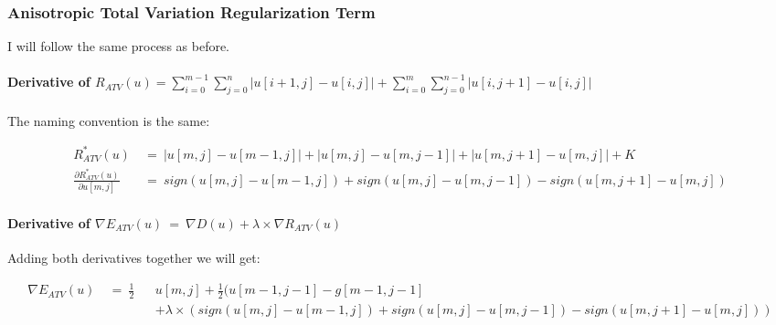 \documentclass{report}
\begin{document}
			\subsubsection{Anisotropic Total Variation Regularization Term}
			\startsubsection
				I will follow the same process as before.
				\vspace{-0.4cm} \paragraph{Derivative of $R_{ATV}(u) = \sum_{i=0}^{m-1} \sum_{j=0}^{n} | u[i+1,j] - u[i,j] | + \sum_{i=0}^{m} \sum_{j=0}^{n-1} | u[i,j+1] - u[i,j] |$}
				\startsubsection
					\vspace{0.2cm} The naming convention is the same:
				\closesection
				\begin{adjustwidth}{-4em}{}
					\vspace{-0.5cm}
					\begin{align*}
						R_{ATV}^*(u) \ & = \ |u[m,j] - u[m-1,j]| + |u[m,j] - u[m,j-1]| + |u[m,j+1] - u[m,j]| + K \\
						\frac{\partial R_{ATV}^*(u)}{\partial u[m,j]} \ & = \ sign(u[m,j] - u[m-1,j]) + sign(u[m,j] - u[m,j-1]) - sign(u[m,j+1] - u[m,j])
					\end{align*}
				\end{adjustwidth}
				\vspace{-0.4cm} \paragraph{Derivative of $\nabla E_{ATV}(u) \ = \ \nabla D(u) + \lambda \times \nabla R_{ATV}(u)$}
				\startsubsection
					Adding both derivatives together we will get:
				\closesection
				\begin{adjustwidth}{-6em}{}
					\vspace{-0.6cm}
					\begin{align*}
						\nabla E_{ATV}(u) \ & = \ \frac{1}{2} && u[m,j]  + \frac{1}{2} (u[m-1,j-1] - g[m-1,j-1] \\
						&&& + \lambda \times (sign(u[m,j] - u[m-1,j]) + sign(u[m,j] - u[m,j-1]) - sign(u[m,j+1] - u[m,j]))
					\end{align*}
				\end{adjustwidth}
			\closesection
		\closesection
	\closesection
\end{document}
